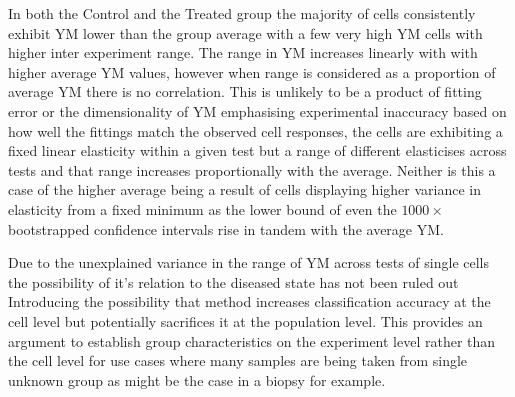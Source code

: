 \documentclass[
  paper=a4,
  ,captions=tableheading
]{scrartcl}
\makeatletter
\newcommand*\pandocbounded[1]{%
  \sbox\pandoc@box{#1}%
  \Gscale@div\@tempa{\textheight}{\dimexpr\ht\pandoc@box+\dp\pandoc@box\relax}%
  \Gscale@div\@tempb{\linewidth}{\wd\pandoc@box}%
  \ifdim\@tempb\p@<\@tempa\p@\let\@tempa\@tempb\fi%
  \ifdim\@tempa\p@<\p@\scalebox{\@tempa}{\usebox\pandoc@box}%
  \else\usebox{\pandoc@box}%
  \fi%
}
\makeatother
\begin{document}
\pandocbounded{}
\pandocbounded{}
\pandocbounded{}
\pandocbounded{}
\pandocbounded{}

In both the Control and the Treated group the majority of cells
consistently exhibit YM lower than the group average with a few very
high YM cells with higher inter experiment range. The range in YM
increases linearly with with higher average YM values, however when
range is considered as a proportion of average YM there is no
correlation. This is unlikely to be a product of fitting error or the
dimensionality of YM emphasising experimental inaccuracy based on how
well the fittings match the observed cell responses, the cells are
exhibiting a fixed linear elasticity within a given test but a range of
different elasticises across tests and that range increases
proportionally with the average. Neither is this a case of the higher
average being a result of cells displaying higher variance in elasticity
from a fixed minimum as the lower bound of even the \(1000\times\)
bootstrapped confidence intervals rise in tandem with the average YM.

\pandocbounded{}

Due to the unexplained variance in the range of YM across tests of
single cells the possibility of it's relation to the diseased state has
not been ruled out Introducing the possibility that method increases
classification accuracy at the cell level but potentially sacrifices it
at the population level. This provides an argument to establish group
characteristics on the experiment level rather than the cell level for
use cases where many samples are being taken from single unknown group
as might be the case in a biopsy for example.
\end{document}
